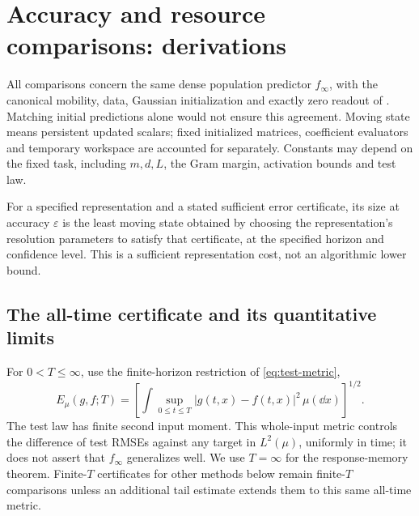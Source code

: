 \section{Accuracy and resource comparisons: derivations}
\label{app:comparison}
\label{app:size}

All comparisons concern the same dense population predictor $f_\infty$,
with the canonical mobility, data, Gaussian initialization and exactly zero
readout of .  Matching initial predictions alone would
not ensure this agreement.  Moving state means persistent updated scalars;
fixed initialized matrices, coefficient evaluators and temporary workspace
are accounted for separately.  Constants may depend on the fixed task,
including $m,d,L$, the Gram margin, activation bounds and test law.

\begin{definition}
\label{def:size}
For a specified representation and a stated sufficient error certificate,
its size at accuracy $\varepsilon$ is the least moving state obtained by
choosing the representation's resolution parameters to satisfy that
certificate, at the specified horizon and confidence level.  This is a
sufficient representation cost, not an algorithmic lower bound.
\end{definition}

\subsection{The all-time certificate and its quantitative limits}
\label{app:comparison-opt}

For $0<T\le\infty$, use the finite-horizon restriction of
\eqref{eq:test-metric},
\begin{equation}
 E_\mu(g,f;T)=\left[\int\sup_{0\le t\le T}
                  |g(t,x)-f(t,x)|^2\,\mu(\dd x)\right]^{1/2}.
 \label{cmp:test-error}
\end{equation}
The test law has finite second input moment.  This whole-input metric
controls the difference of test RMSEs against any target in $L^2(\mu)$,
uniformly in time; it does not assert that $f_\infty$ generalizes well.
We use $T=\infty$ for the response-memory theorem.  Finite-$T$ certificates
for other methods below remain finite-$T$ comparisons unless an additional
tail estimate extends them to this same all-time metric.

